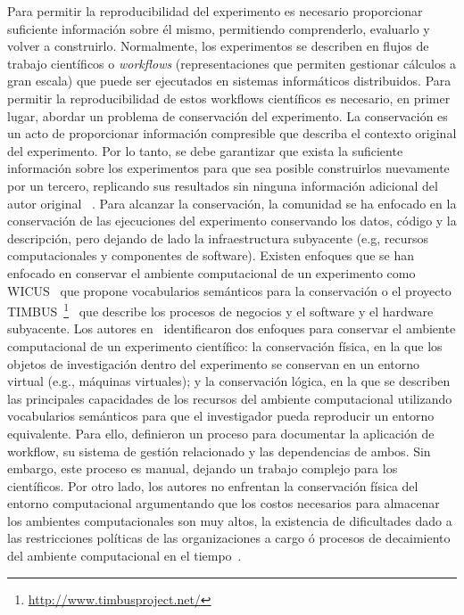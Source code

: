Para permitir la reproducibilidad del experimento es necesario proporcionar suficiente información sobre él mismo, permitiendo comprenderlo, evaluarlo y volver a construirlo. 
Normalmente, los experimentos se describen en flujos de trabajo científicos o \emph{workflows} (representaciones que permiten gestionar cálculos a gran escala) que puede ser ejecutados en sistemas informáticos distribuidos.
Para permitir la reproducibilidad de estos workflows científicos es necesario, en primer lugar, abordar un problema de conservación del experimento.
La conservación es un acto de proporcionar información compresible que describa el contexto original del experimento. Por lo tanto, se debe garantizar que exista la suficiente información sobre los experimentos para que sea posible construirlos nuevamente por un tercero, replicando sus resultados sin ninguna información adicional del autor original ~\cite{garijo2013quantifying}.
Para alcanzar la conservación, la comunidad se ha enfocado en la conservación de las ejecuciones del experimento conservando los datos, código y la descripción, pero dejando de lado la infraestructura subyacente (e.g, recursos computacionales y componentes de software).
Existen enfoques que se han enfocado en conservar el ambiente computacional de un experimento como WICUS~\cite{santana2017reproducibility} que propone vocabularios semánticos para la conservación o el proyecto TIMBUS~\footnote{\url{http://www.timbusproject.net/}}~\cite{dappert2013describing} que describe los procesos de negocios y el software y el hardware subyacente. 
Los autores en~\cite{santana2017reproducibility} identificaron dos enfoques para conservar el ambiente computacional de un experimento científico: la conservación física, en la que los objetos de investigación dentro del experimento se conservan en un entorno virtual (e.g., máquinas virtuales); y la conservación lógica, en la que se describen las principales capacidades de los recursos del ambiente computacional utilizando vocabularios semánticos para que el investigador pueda reproducir un entorno equivalente.
Para ello, definieron un proceso para documentar la aplicación de workflow, su sistema de gestión relacionado y las dependencias de ambos.
Sin embargo, este proceso es manual, dejando un trabajo complejo para los científicos. 
Por otro lado, los autores no enfrentan la conservación física del entorno computacional argumentando que los costos necesarios para almacenar los ambientes computacionales son muy altos, la existencia de dificultades dado a las restricciones políticas de las organizaciones a cargo ó procesos de decaimiento del ambiente computacional en el tiempo~\cite{DBLP:journals/fgcs/DeelmanVJRCMMCS15}. 

